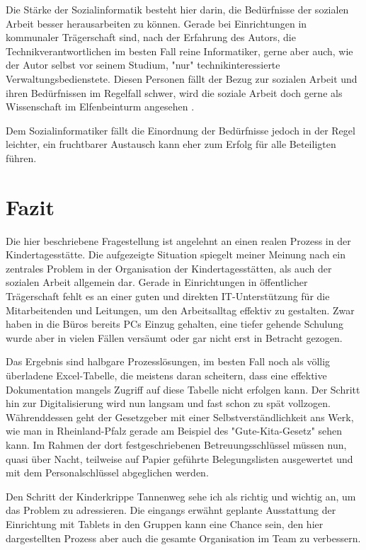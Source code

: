 Die Stärke der Sozialinformatik besteht hier darin, die Bedürfnisse der sozialen Arbeit besser herausarbeiten zu können. Gerade bei Einrichtungen in kommunaler Trägerschaft sind, nach der Erfahrung des Autors, die Technikverantwortlichen im besten Fall reine Informatiker, gerne aber auch, wie der Autor selbst vor seinem Studium, "{}nur"{} technikinteressierte Verwaltungsbedienstete.
Diesen Personen fällt der Bezug zur sozialen Arbeit und ihren Bedürfnissen im Regelfall schwer, wird die soziale Arbeit doch gerne als Wissenschaft im Elfenbeinturm angesehen \citep[vgl.][9]{kromrey2009}.

Dem Sozialinformatiker fällt die Einordnung der Bedürfnisse jedoch in der Regel leichter, ein fruchtbarer Austausch kann eher zum Erfolg für alle Beteiligten führen.

\newpage
\section{Fazit}

Die hier beschriebene Fragestellung ist angelehnt an einen realen Prozess in der Kindertagesstätte.
Die aufgezeigte Situation spiegelt meiner Meinung nach ein zentrales Problem in der Organisation der Kindertagesstätten, als auch der sozialen Arbeit allgemein dar. 
Gerade in Einrichtungen in öffentlicher Trägerschaft fehlt es an einer guten und direkten IT-Unterstützung für die Mitarbeitenden und Leitungen, um den Arbeitsalltag effektiv zu gestalten.
Zwar haben in die Büros bereits PCs Einzug gehalten, eine tiefer gehende Schulung wurde aber in vielen Fällen versäumt oder gar nicht erst in Betracht gezogen. 

Das Ergebnis sind halbgare Prozesslösungen, im besten Fall noch als völlig überladene Excel-Tabelle, die meistens daran scheitern, dass eine effektive Dokumentation mangels Zugriff auf diese Tabelle nicht erfolgen kann.
Der Schritt hin zur Digitalisierung wird nun langsam und fast schon zu spät vollzogen.
Währenddessen geht der Gesetzgeber mit einer Selbstverständlichkeit ans Werk, wie man in Rheinland-Pfalz gerade am Beispiel des "{}Gute-Kita-Gesetz"{} sehen kann. Im Rahmen der dort festgeschriebenen Betreuungsschlüssel müssen nun, quasi über Nacht, teilweise auf Papier geführte Belegungslisten ausgewertet und mit dem Personalschlüssel abgeglichen werden.

Den Schritt der Kinderkrippe Tannenweg sehe ich als richtig und wichtig an, um das Problem zu adressieren. Die eingangs erwähnt geplante Ausstattung der Einrichtung mit Tablets in den Gruppen kann eine Chance sein, den hier dargestellten Prozess aber auch die gesamte Organisation im Team zu verbessern.

